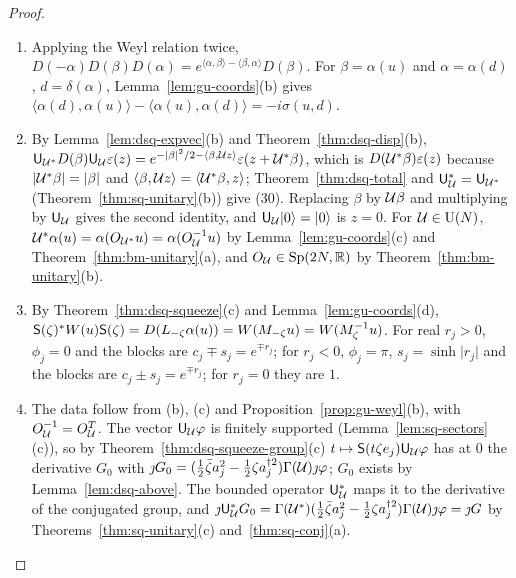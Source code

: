 \begin{veteenv}
\begin{proof}
\begin{enumerate}
\item[(a)] Applying the Weyl relation twice, $D(-\alpha)D(\beta)D(\alpha)=e^{\langle\alpha,\beta\rangle-\langle\beta,\alpha\rangle}D(\beta)$. For
$\beta=\alpha(u)$ and $\alpha=\alpha(d)$, $d=\delta(\alpha)$, Lemma~\ref{lem:gu-coords}(b) gives
$\langle\alpha(d),\alpha(u)\rangle-\langle\alpha(u),\alpha(d)\rangle=-i\sigma(u,d)$.
\item[(b)] By Lemma~\ref{lem:dsq-expvec}(b) and Theorem~\ref{thm:dsq-disp}(b), $\mathsf U_{\mathcal U^*}D(\beta)\mathsf U_\mathcal U\varepsilon(z)=
e^{-\lvert\beta\rvert^2/2-\langle\beta,\mathcal U z\rangle}\varepsilon(z+\mathcal U^*\beta)$, which is $D(\mathcal U^*\beta)\varepsilon(z)$ because
$\lvert\mathcal U^*\beta\rvert=\lvert\beta\rvert$ and $\langle\beta,\mathcal U z\rangle=\langle\mathcal U^*\beta,z\rangle$; Theorem~\ref{thm:dsq-total} and
$\mathsf U_\mathcal U^*=\mathsf U_{\mathcal U^*}$ (Theorem~\ref{thm:sq-unitary}(b)) give (30). Replacing $\beta$ by $\mathcal U\beta$ and multiplying by $\mathsf U_\mathcal U$ gives the
second identity, and $\mathsf U_\mathcal U\lvert 0\rangle=\lvert 0\rangle$ is $z=0$. For $\mathcal U\in\mathrm{U}(N)$, $\mathcal U^*\alpha(u)=\alpha(O_{\mathcal U^*}u)=\alpha(O_\mathcal U^{-1}u)$ by
Lemma~\ref{lem:gu-coords}(c) and Theorem~\ref{thm:bm-unitary}(a), and $O_\mathcal U\in\mathrm{Sp}(2N,\mathbb R)$ by Theorem~\ref{thm:bm-unitary}(b).
\item[(c)] By Theorem~\ref{thm:dsq-squeeze}(c) and Lemma~\ref{lem:gu-coords}(d), $\mathsf S(\zeta)^*W(u)\mathsf S(\zeta)=D(L_{-\zeta}\alpha(u))=
W(M_{-\zeta}u)=W(M_\zeta^{-1}u)$. For real $r_j>0$, $\phi_j=0$ and the blocks are $c_j\mp s_j=e^{\mp r_j}$; for $r_j<0$, $\phi_j=\pi$,
$s_j=\sinh\lvert r_j\rvert$ and the blocks are $c_j\pm s_j=e^{\mp r_j}$; for $r_j=0$ they are $1$.
\item[(d)] The data follow from (b), (c) and Proposition~\ref{prop:gu-weyl}(b), with $O_\mathcal U^{-1}=O_\mathcal U^T$. The vector $\mathsf U_\mathcal U\varphi$ is
finitely supported (Lemma~\ref{lem:sq-sectors}(c)), so by Theorem~\ref{thm:dsq-squeeze-group}(c) $t\mapsto\mathsf S(t\zeta e_j)\mathsf U_\mathcal U\varphi$
has at $0$ the derivative $G_0$ with $\jmath G_0=(\frac12\bar\zeta a_j^2-\frac12\zeta a_j^{\dagger2})\Gamma(\mathcal U)\jmath\varphi$; $G_0$ exists by
Lemma~\ref{lem:dsq-above}. The bounded operator $\mathsf U_\mathcal U^*$ maps it to the derivative of the conjugated group, and
$\jmath\mathsf U_\mathcal U^*G_0=\Gamma(\mathcal U^*)(\frac12\bar\zeta a_j^2-\frac12\zeta a_j^{\dagger2})\Gamma(\mathcal U)\jmath\varphi=\jmath G$ by
Theorems~\ref{thm:sq-unitary}(c) and~\ref{thm:sq-conj}(a).\qedhere
\end{enumerate}
\end{proof}


\end{veteenv}
